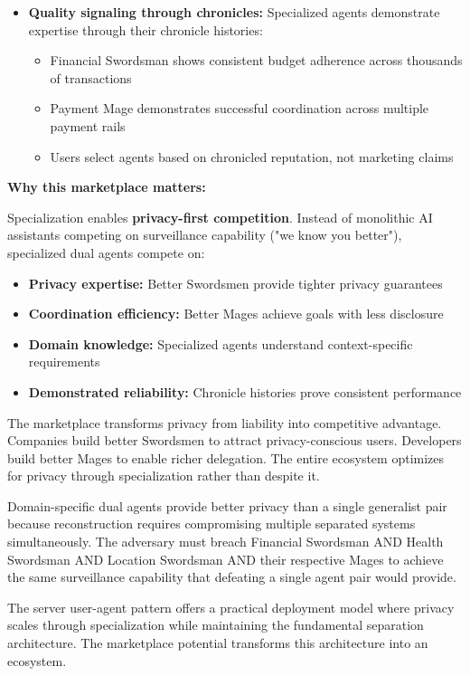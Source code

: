 \documentclass[11pt,a4paper]{article}
\theoremstyle{definition}
\begin{document}
\begin{itemize}
    \item \textbf{Quality signaling through chronicles:} Specialized agents demonstrate expertise through their chronicle histories:
    \begin{itemize}
        \item Financial Swordsman shows consistent budget adherence across thousands of transactions
        \item Payment Mage demonstrates successful coordination across multiple payment rails
        \item Users select agents based on chronicled reputation, not marketing claims
    \end{itemize}
\end{itemize}

\textbf{Why this marketplace matters:}

Specialization enables \textbf{privacy-first competition}. Instead of monolithic AI assistants competing on surveillance capability ("we know you better"), specialized dual agents compete on:

\begin{itemize}
    \item \textbf{Privacy expertise:} Better Swordsmen provide tighter privacy guarantees
    \item \textbf{Coordination efficiency:} Better Mages achieve goals with less disclosure
    \item \textbf{Domain knowledge:} Specialized agents understand context-specific requirements
    \item \textbf{Demonstrated reliability:} Chronicle histories prove consistent performance
\end{itemize}

The marketplace transforms privacy from liability into competitive advantage. Companies build better Swordsmen to attract privacy-conscious users. Developers build better Mages to enable richer delegation. The entire ecosystem optimizes for privacy through specialization rather than despite it.

Domain-specific dual agents provide better privacy than a single generalist pair because reconstruction requires compromising multiple separated systems simultaneously. The adversary must breach Financial Swordsman AND Health Swordsman AND Location Swordsman AND their respective Mages to achieve the same surveillance capability that defeating a single agent pair would provide.

The server user-agent pattern offers a practical deployment model where privacy scales through specialization while maintaining the fundamental separation architecture. The marketplace potential transforms this architecture into an ecosystem.
\end{document}
